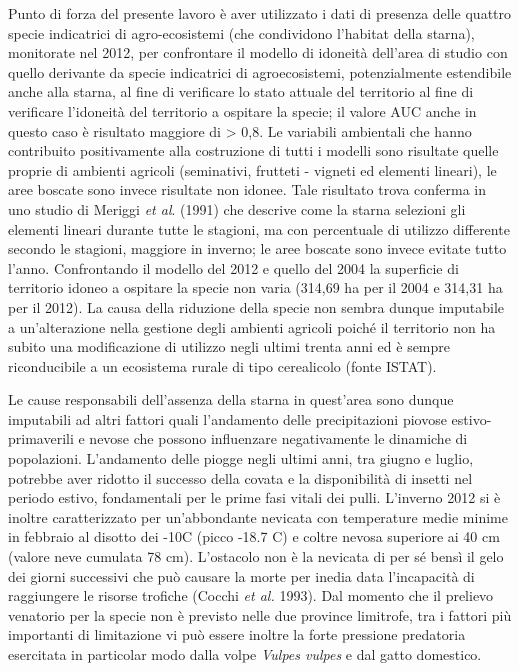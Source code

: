 Punto di forza del presente lavoro \`e aver utilizzato i dati di
presenza delle quattro specie indicatrici di agro-ecosistemi (che
condividono l{\textquoteright}habitat della starna), monitorate nel
2012, per confrontare il modello di idoneit\`a
dell{\textquoteright}area di studio con quello derivante da specie
indicatrici di agroecosistemi, potenzialmente estendibile anche alla
starna, al fine di verificare lo stato attuale del territorio al fine
di verificare l{\textquoteright}idoneit\`a del territorio a ospitare la
specie; il valore AUC anche in questo caso \`e risultato maggiore di
{\textgreater} 0,8. Le variabili ambientali che hanno contribuito
positivamente alla costruzione di tutti i modelli sono risultate quelle
proprie di ambienti agricoli (seminativi, frutteti - vigneti ed
elementi lineari), le aree boscate sono invece risultate non idonee.
Tale risultato trova conferma in uno studio di Meriggi \textit{et al}.
(1991) che descrive come la starna selezioni gli elementi lineari
durante tutte le stagioni, ma con percentuale di utilizzo differente
secondo le stagioni, maggiore in inverno; le aree boscate sono invece
evitate tutto l'anno. Confrontando il modello del 2012
e quello del 2004 la superficie di territorio idoneo a ospitare la
specie non varia (314,69 ha per il 2004 e 314,31 ha per il 2012).  La
causa della riduzione della specie non sembra dunque imputabile a
un'alterazione nella gestione degli ambienti agricoli
poich\'e il territorio non ha subito una modificazione di utilizzo
negli ultimi trenta anni ed \`e sempre riconducibile a un ecosistema
rurale di tipo cerealicolo (fonte ISTAT).  

Le cause responsabili dell'assenza della starna in
quest{\textquoteright}area sono dunque imputabili ad altri fattori
quali l'andamento delle precipitazioni piovose
estivo-primaverili e nevose che possono influenzare negativamente le
dinamiche di popolazioni. L'andamento delle piogge
negli ultimi anni, tra giugno e luglio, potrebbe aver ridotto il
successo della covata e la disponibilit\`a di insetti nel periodo
estivo, fondamentali per le prime fasi vitali dei pulli.
L'inverno 2012 si \`e inoltre caratterizzato per
un'abbondante nevicata con temperature medie minime in
febbraio al disotto dei -10{\textdegree}C (picco -18.7 {\textdegree}C)
e coltre nevosa superiore ai 40 cm (valore neve cumulata 78 cm).
L'ostacolo non \`e la nevicata di per s\'e bens\`i il
gelo dei giorni successivi che pu\`o causare la morte per inedia data
l'incapacit\`a di raggiungere le risorse trofiche
(Cocchi \textit{et al.} 1993). Dal momento che il prelievo venatorio
per la specie non \`e previsto nelle due province limitrofe, tra i
fattori pi\`u importanti di limitazione vi pu\`o essere inoltre la
forte pressione predatoria esercitata in particolar modo dalla volpe
\textit{Vulpes vulpes} e dal gatto domestico.  

